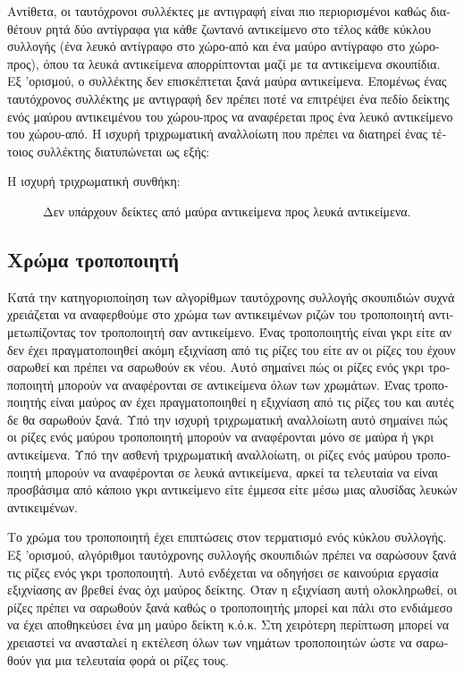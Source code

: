 \begin{greek}
Αντίθετα, οι ταυτόχρονοι συλλέκτες με αντιγραφή είναι πιο
περιορισμένοι καθώς διαθέτουν ρητά δύο αντίγραφα για κάθε
ζωντανό αντικείμενο στο τέλος κάθε κύκλου συλλογής (ένα
λευκό αντίγραφο στο χώρο-από και ένα μαύρο αντίγραφο στο
χώρο-προς), όπου τα λευκά αντικείμενα απορρίπτονται μαζί
με τα αντικείμενα σκουπίδια. Εξ 'ορισμού, ο συλλέκτης δεν
επισκέπτεται ξανά μαύρα αντικείμενα. Επομένως ένας ταυτόχρονος
συλλέκτης με αντιγραφή δεν πρέπει ποτέ να επιτρέψει ένα
πεδίο δείκτης ενός μαύρου αντικειμένου του χώρου-προς να
αναφέρεται προς ένα λευκό αντικείμενο του χώρου-από.
Η ισχυρή τριχρωματική αναλλοίωτη που πρέπει να διατηρεί
ένας τέτοιος συλλέκτης διατυπώνεται ως εξής:

\begin{description}
  \item[Η ισχυρή τριχρωματική συνθήκη:] Δεν υπάρχουν δείκτες
από μαύρα αντικείμενα προς λευκά αντικείμενα.
\end{description}

\subsection{Χρώμα τροποποιητή}
Κατά την κατηγοριοποίηση των αλγορίθμων ταυτόχρονης συλλογής
σκουπιδιών συχνά χρειάζεται να αναφερθούμε στο χρώμα των
αντικειμένων ριζών του τροποποιητή αντιμετωπίζοντας τον
τροποποιητή σαν αντικείμενο. Ένας τροποποιητής είναι γκρι
είτε αν δεν έχει πραγματοποιηθεί ακόμη εξιχνίαση από τις
ρίζες του είτε αν οι ρίζες του έχουν σαρωθεί και πρέπει
να σαρωθούν εκ νέου. Αυτό σημαίνει πώς οι ρίζες ενός γκρι
τροποποιητή μπορούν να αναφέρονται σε αντικείμενα όλων των
χρωμάτων. Ένας τροποποιητής είναι μαύρος αν έχει πραγματοποιηθεί
η εξιχνίαση από τις ρίζες του και αυτές δε θα σαρωθούν ξανά.
Υπό την ισχυρή τριχρωματική αναλλοίωτη αυτό σημαίνει πώς
οι ρίζες ενός μαύρου τροποποιητή μπορούν να αναφέρονται
μόνο σε μαύρα ή γκρι αντικείμενα. Υπό την ασθενή τριχρωματική
αναλλοίωτη, οι ρίζες ενός μαύρου τροποποιητή μπορούν να
αναφέρονται σε λευκά αντικείμενα, αρκεί τα τελευταία να είναι
προσβάσιμα από κάποιο γκρι αντικείμενο είτε έμμεσα είτε μέσω
μιας αλυσίδας λευκών αντικειμένων.

Το χρώμα του τροποποιητή έχει επιπτώσεις στον τερματισμό
ενός κύκλου συλλογής. Εξ 'ορισμού, αλγόριθμοι ταυτόχρονης
συλλογής σκουπιδιών πρέπει να σαρώσουν ξανά τις ρίζες ενός
γκρι τροποποιητή. Αυτό ενδέχεται να οδηγήσει σε καινούρια
εργασία εξιχνίασης αν βρεθεί ένας όχι μαύρος δείκτης. Όταν
η εξιχνίαση αυτή ολοκληρωθεί, οι ρίζες πρέπει να σαρωθούν
ξανά καθώς ο τροποποιητής μπορεί και πάλι στο ενδιάμεσο
να έχει αποθηκεύσει ένα μη μαύρο δείκτη κ.ό.κ. Στη χειρότερη
περίπτωση μπορεί να χρειαστεί να ανασταλεί η εκτέλεση όλων
των νημάτων τροποποιητών ώστε να σαρωθούν για μια τελευταία
φορά οι ρίζες τους.


\end{greek}
